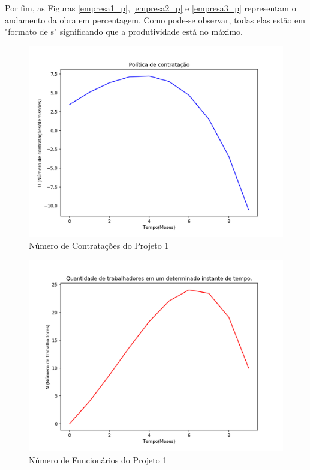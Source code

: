 \documentclass[14pt, oneside]{book}
\theoremstyle{definition}
\begin{document}
            Por fim, as Figuras \ref{empresa1_p}, \ref{empresa2_p} e \ref{empresa3_p} representam o andamento da obra em percentagem. Como pode-se observar, todas elas estão em "formato de s" significando que a produtividade está no máximo.
            
            \begin{figure}[H]
                \centering
                \includegraphics[scale=0.9]{empresa1_u.png}
                \caption{Número de Contratações do Projeto 1}
                \label{empresa1_u}
            \end{figure}
            
            \begin{figure}[H]
                \centering
                \includegraphics[scale=0.9]{empresa1_n.png}
                \caption{Número de Funcionários do Projeto 1}
                \label{empresa1_n}
            \end{figure}
            
\end{document}

